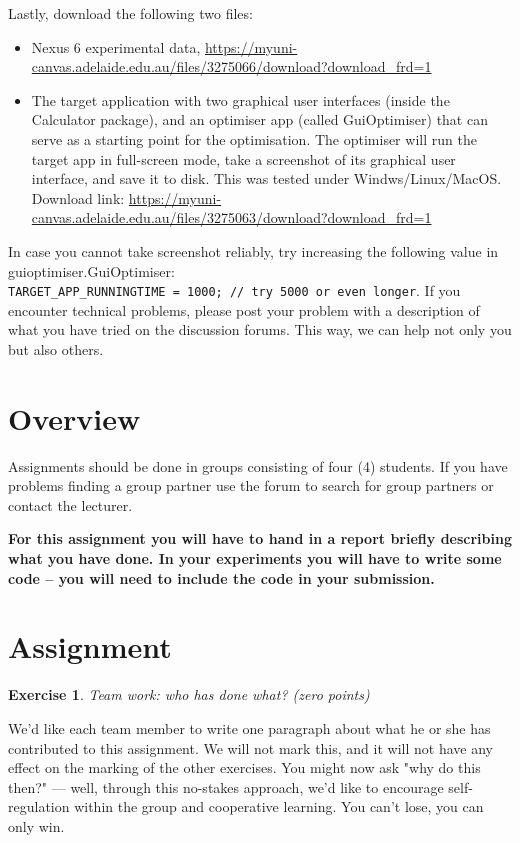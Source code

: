 \documentclass{pracs}
\newtheorem{exercise}{Exercise}
\begin{document}
Lastly, download the following two files:

\begin{itemize}
\item Nexus 6 experimental data, \url{https://myuni-canvas.adelaide.edu.au/files/3275066/download?download_frd=1}
\item The target application with two graphical user interfaces (inside the Calculator package), and  an optimiser app (called GuiOptimiser) that can serve as a starting point for the optimisation. The optimiser will run the target app in full-screen mode, take a screenshot of its graphical user interface, and save it to disk. This was tested under Windws/Linux/MacOS. Download link: \url{https://myuni-canvas.adelaide.edu.au/files/3275063/download?download_frd=1}
\end{itemize}

In case you cannot take screenshot reliably, try increasing the following value in guioptimiser.GuiOptimiser: \\\texttt{TARGET\_APP\_RUNNINGTIME = 1000; // try 5000 or even longer}.
If you encounter technical problems, please post your problem with a description of what you have tried on the discussion forums. This way, we can help not only you but also others.





\section{Overview}
Assignments should be done in groups consisting of four (4) students.  If you have problems finding a group partner use the forum to search for group partners or contact the lecturer.

\textbf{For this assignment you will have to hand in a report briefly describing what you have done. In your experiments you will have to write some code -- you will need to include the code in your submission.}

\section{Assignment}

\begin{exercise}
Team work: who has done what? (zero points)
\end{exercise}

We'd like each team member to write one paragraph about what he or she has contributed to this assignment. We will not mark this, and it will not have any effect on the marking of the other exercises. You might now ask "why do this then?" --- well, through this no-stakes approach, we'd like to encourage self-regulation within the group and cooperative learning. You can't lose, you can only win.
\end{document}
